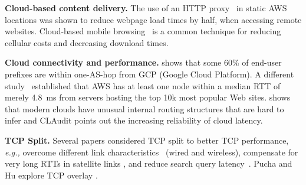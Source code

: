 \documentclass[sigconf,usenames,dvipsnames,geometry]{acmart}
\newcommand{\mycomm}[3]{{\color{#2} \textbf{[#1: #3]}}}
\newcommand{\mycomm}[3]{}
\newcommand{\IK}[1]{\mycomm{IK}{blue}{#1}}
\providecommand{\eg}{\emph{e.g.,} }
\newcommand{\T}[1]{\smallskip\noindent\textbf{#1}} %
\begin{document}
\T{Cloud-based content delivery.} The use of an HTTP proxy~\cite{cgn2017} in static AWS locations was shown to reduce webpage load times by half, when accessing remote websites. Cloud-based mobile browsing~\cite{zhao2011reducing,wang2013accelerating} is a common technique for reducing cellular costs and decreasing download times.

\T{Cloud connectivity and performance.} \cite{one-hop} shows that some 60\% of end-user prefixes are within one-AS-hop from GCP (Google Cloud Platform). A different study~\cite{cgn2017} established that AWS has at least one node within a median RTT of merely 4.8~ms from servers hosting the top 10k most popular Web sites. \cite{unusual} shows that modern clouds have unusual internal routing structures that are hard to infer and CLAudit \cite{multidimensional} points out the increasing reliability of cloud latency. 

\T{TCP Split.} Several papers considered TCP split to better TCP performance, \eg overcome different link characteristics~ \cite{Kopparty2002} (wired and wireless), compensate for very long RTTs in satellite links \cite{luglio2004}, and reduce search query latency~\cite{pathak2010measuring}. 
Pucha and Hu explore TCP overlay \cite{pucha2005overlay, pucha2005slot}. 


\end{document}
